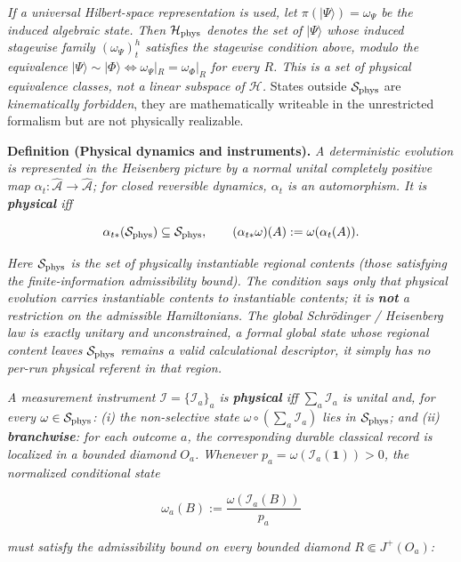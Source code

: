 \documentclass[11pt,a4paper]{article}
\begin{document}
\emph{If a universal Hilbert-space representation is used, let $\pi(|\Psi\rangle) = \omega_\Psi$ be the induced algebraic state. Then $\mathcal{H}_{\rm phys}$ denotes the set of $|\Psi\rangle$ whose induced stagewise family $(\omega_\Psi)_t^h$ satisfies the stagewise condition above, modulo the equivalence $|\Psi\rangle \sim |\Phi\rangle \iff \omega_\Psi|_R = \omega_\Phi|_R$ for every $R$. This is a set of physical equivalence classes, not a linear subspace of $\mathcal{H}$.} States outside $\mathcal{S}_{\rm phys}$ are \emph{kinematically forbidden}, they are mathematically writeable in the unrestricted formalism but are not physically realizable.

\textbf{Definition (Physical dynamics and instruments).} \emph{A deterministic evolution is represented in the Heisenberg picture by a normal unital completely positive map $\alpha_t: \hat{\mathcal{A}} \to \hat{\mathcal{A}}$; for closed reversible dynamics, $\alpha_t$ is an automorphism. It is \textbf{physical} iff}

\[
\alpha_{t*}(\mathcal{S}_{\rm phys}) \subseteq \mathcal{S}_{\rm phys}, \qquad (\alpha_{t*}\omega)(A) := \omega(\alpha_t(A)).
\]

\emph{Here $\mathcal{S}_{\rm phys}$ is the set of physically instantiable regional contents (those satisfying the finite-information admissibility bound). The condition says only that physical evolution carries instantiable contents to instantiable contents; it is \textbf{not} a restriction on the admissible Hamiltonians. The global Schrödinger / Heisenberg law is exactly unitary and unconstrained, a formal global state whose regional content leaves $\mathcal{S}_{\rm phys}$ remains a valid calculational descriptor, it simply has no per-run physical referent in that region.}

\emph{A measurement instrument $\mathcal{I} = \{\mathcal{I}_a\}_a$ is \textbf{physical} iff $\sum_a \mathcal{I}_a$ is unital and, for every $\omega \in \mathcal{S}_{\rm phys}$:}
\emph{(i) the non-selective state $\omega \circ (\sum_a \mathcal{I}_a)$ lies in $\mathcal{S}_{\rm phys}$; and}
\emph{(ii) \textbf{branchwise}: for each outcome $a$, the corresponding durable classical record is localized in a bounded diamond $O_a$. Whenever $p_a = \omega(\mathcal{I}_a(\mathbf{1})) > 0$, the normalized conditional state}

\[
\omega_a(B) := \frac{\omega(\mathcal{I}_a(B))}{p_a}
\]

\emph{must satisfy the admissibility bound on every bounded diamond $R \Subset J^+(O_a)$:}
\end{document}
